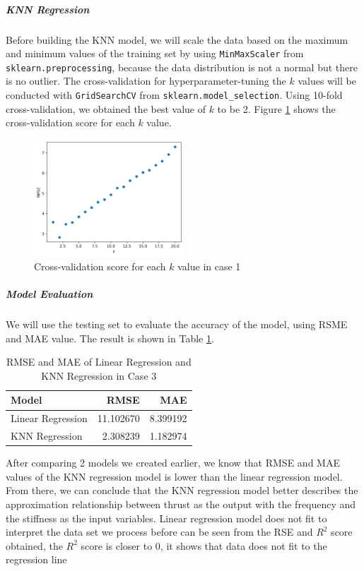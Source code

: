 \documentclass[conf]{new-aiaa}
\begin{document}
\subparagraph{KNN Regression}
Before building the KNN model, we will scale the data based on the maximum and minimum values of the training set by using \texttt{MinMaxScaler} from \texttt{sklearn.preprocessing}, because the data distribution is not a normal but there is no outlier. The cross-validation for hyperparameter-tuning the $k$ values will be conducted with \texttt{GridSearchCV} from \texttt{sklearn.model\_selection}. Using 10-fold cross-validation, we obtained the best value of $k$ to be 2. Figure \ref{fig:case1_knn_rmse} shows the cross-validation score for each $k$ value. 
\begin{figure}[H]
    \centering
    \includegraphics[width=0.5\textwidth]{graph/case1_knn_rmse.png}
    \caption{\label{fig:case1_knn_rmse} Cross-validation score for each $k$ value in case 1}
\end{figure}

\subparagraph{Model Evaluation}
We will use the testing set to evaluate the accuracy of the model, using RSME and MAE value. The result is shown in Table \ref{tab:case1_model_eval}.
\begin{table}[H]
    \centering
    \caption{\label{tab:case1_model_eval} RMSE and MAE of Linear Regression and KNN Regression in Case 3}
    \begin{tabular}{lrr}
        \toprule
        Model &      RMSE &       MAE \\
        \midrule
        Linear Regression &  11.102670 &  8.399192 \\
        KNN Regression    &  2.308239 &  1.182974 \\
        \bottomrule
    \end{tabular}
\end{table}

After comparing 2 models we created earlier, we know that RMSE and MAE values of the KNN regression model is lower than the linear regression model. From there, we can conclude that the KNN regression model better describes the approximation relationship between thrust as the output with the frequency and the stiffness as the input variables. 
Linear regression model does not fit to interpret the data set we process before can be seen from the RSE and $R^2$ score obtained, the $R^2$ score is closer to 0, it shows that data does not fit to the regression line
\end{document}
